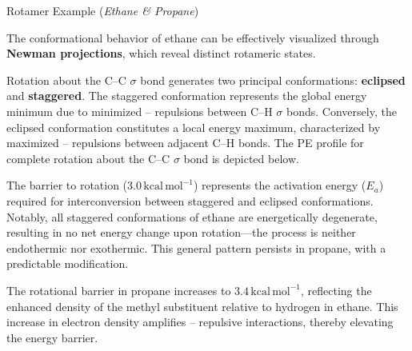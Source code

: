 \documentclass[10pt]{article}
\begin{document}
    \begin{core}[label=core:rotamer_ethane]{Rotamer Example (\textit{Ethane \& Propane})}
        
      The conformational behavior of ethane can be effectively visualized through \textbf{Newman projections}, which reveal distinct rotameric states.


      Rotation about the C--C $\sigma$ bond generates two principal conformations: \textbf{eclipsed} and \textbf{staggered}. The staggered conformation represents the global energy minimum due to minimized -- repulsions between C--H $\sigma$ bonds. Conversely, the eclipsed conformation constitutes a local energy maximum, characterized by maximized -- repulsions between adjacent C--H bonds. The PE profile for complete rotation about the C--C $\sigma$ bond is depicted below.

      
      The barrier to rotation ($3.0\,\text{kcal}\,\text{mol}^{-1}$) represents the activation energy ($E_a$) required for interconversion between staggered and eclipsed conformations. Notably, all staggered conformations of ethane are energetically degenerate, resulting in no net energy change upon rotation---the process is neither endothermic nor exothermic. This general pattern persists in propane, with a predictable modification.

            
      The rotational barrier in propane increases to $3.4\,\text{kcal}\,\text{mol}^{-1}$, reflecting the enhanced  density of the methyl substituent relative to hydrogen in ethane. This increase in electron density amplifies -- repulsive interactions, thereby elevating the energy barrier.

    \end{core}
\end{document}
